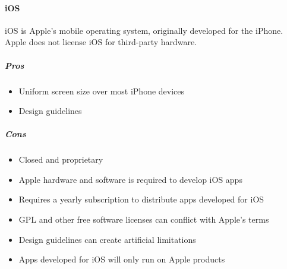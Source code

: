 \paragraph{\bf{iOS}}

	iOS is Apple's mobile operating system, originally developed for the
	iPhone. Apple does not license iOS for third-party hardware.

	\subparagraph{Pros}
	\begin{itemize}
		\item Uniform screen size over most iPhone devices
		\item Design guidelines
	\end{itemize}

	\subparagraph{Cons}
		\begin{itemize}
			\item Closed and proprietary
			\item Apple hardware and software is required to develop iOS apps
			\item Requires a yearly subscription to distribute apps developed
			for iOS
			\item GPL and other free software licenses can conflict with
			Apple's terms
			\item Design guidelines can create artificial limitations
			\item Apps developed for iOS will only run on Apple products
		\end{itemize}




